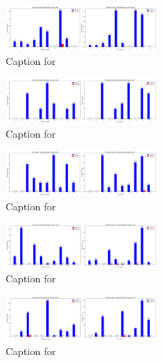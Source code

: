 \documentclass[12pt, a4paper]{article}
\begin{document}
\begin{figure}[ht]
\centering
\includegraphics[width=0.5\textwidth]{combined_class_boundary_pgd/combined_class_9_misclassifications_eps_0.03.png}
\caption{Caption for }
\label{fig:combined_class_9_misclassifications_eps_0.03.png}
\end{figure}

\begin{figure}[ht]
\centering
\includegraphics[width=0.5\textwidth]{combined_class_boundary_pgd/combined_class_0_misclassifications_eps_0.04.png}
\caption{Caption for }
\label{fig:combined_class_0_misclassifications_eps_0.04.png}
\end{figure}

\begin{figure}[ht]
\centering
\includegraphics[width=0.5\textwidth]{combined_class_boundary_pgd/combined_class_1_misclassifications_eps_0.04.png}
\caption{Caption for }
\label{fig:combined_class_1_misclassifications_eps_0.04.png}
\end{figure}

\begin{figure}[ht]
\centering
\includegraphics[width=0.5\textwidth]{combined_class_boundary_pgd/combined_class_2_misclassifications_eps_0.04.png}
\caption{Caption for }
\label{fig:combined_class_2_misclassifications_eps_0.04.png}
\end{figure}




\begin{figure}[ht]
\centering
\includegraphics[width=0.5\textwidth]{combined_class_boundary_pgd/combined_class_3_misclassifications_eps_0.04.png}
\caption{Caption for }
\label{fig:combined_class_3_misclassifications_eps_0.04.png}
\end{figure}
\end{document}
